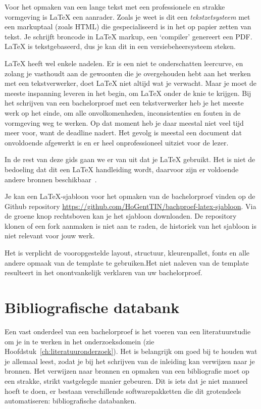 Voor het opmaken van een lange tekst met een professionele en strakke vormgeving is {\LaTeX} een aanrader. Zoals je weet is dit een \emph{tekstzetsysteem} met een markuptaal (zoals HTML) die gespecialiseerd is in het op papier zetten van tekst. Je schrijft broncode in {\LaTeX} markup, een `compiler' genereert een PDF. {\LaTeX} is tekstgebaseerd, dus je kan dit in een versiebeheersysteem steken.

{\LaTeX} heeft wel enkele nadelen. Er is een niet te onderschatten leercurve, en zolang je vasthoudt aan de gewoonten die je overgehouden hebt aan het werken met een tekstverwerker, doet {\LaTeX} niet altijd wat je verwacht. Maar je moet de meeste inspanning leveren in het begin, om {\LaTeX} onder de knie te krijgen. Bij het schrijven van een bachelorproef met een tekstverwerker heb je het meeste werk op het einde, om alle onvolkomenheden, inconsistenties en fouten in de vormgeving weg te werken. Op dat moment heb je daar meestal niet veel tijd meer voor, want de deadline nadert. Het gevolg is meestal een document dat onvoldoende afgewerkt is en er heel onprofessioneel uitziet voor de lezer.

In de rest van deze gids gaan we er van uit dat je {\LaTeX} gebruikt. Het is niet de bedoeling dat dit een {\LaTeX} handleiding wordt, daarvoor zijn er voldoende andere bronnen beschikbaar~\parencite{Oetiker2015}.

Je kan een {\LaTeX}-sjabloon voor het opmaken van de bachelorproef vinden op de Github repository \url{https://github.com/HoGentTIN/bachproef-latex-sjabloon}. Via de groene knop rechtsboven kan je het sjabloon downloaden. De repository klonen of een fork aanmaken is niet aan te raden, de historiek van het sjabloon is niet relevant voor jouw werk.

\begin{framed}
	Het is verplicht de vooropgestelde layout, structuur, kleurenpallet, fonts en alle andere opmaak van de template te gebruiken.Het niet naleven van de template resulteert in het onontvankelijk verklaren van uw bachelorproef.
\end{framed}


\section{Bibliografische databank}
\label{sec:bibliografische-databank}

Een vast onderdeel van een bachelorproef is het voeren van een literatuurstudie om je in te werken in het onderzoeksdomein (zie Hoofdstuk~\ref{ch:literatuuronderzoek}). Het is belangrijk om goed bij te houden wat je allemaal leest, zodat je bij het schrijven van de inleiding kan verwijzen naar je bronnen. Het verwijzen naar bronnen en opmaken van een bibliografie moet op een strakke, strikt vastgelegde manier gebeuren. Dit is iets dat je niet manueel hoeft te doen, er bestaan verschillende softwarepakketten die dit grotendeels automatiseren: bibliografische databanken.

